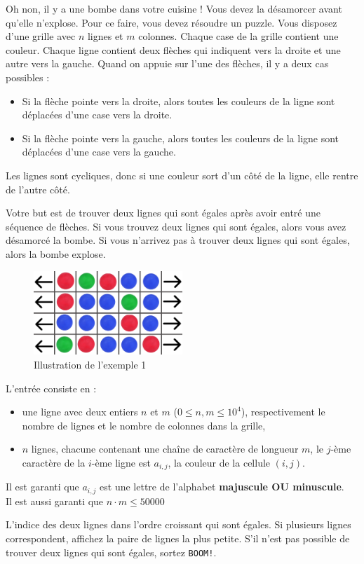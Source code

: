\problemname{\problemyamlname}


Oh non, il y a une bombe dans votre cuisine ! Vous devez la désamorcer avant qu'elle n'explose. Pour ce faire, vous devez résoudre un puzzle.
Vous disposez d'une grille avec $n$ lignes et $m$ colonnes. Chaque case de la grille contient une couleur. Chaque ligne contient deux flèches qui indiquent vers la droite et une autre vers la gauche.
Quand on appuie sur l'une des flèches, il y a deux cas possibles :
\begin{itemize}
    \item Si la flèche pointe vers la droite, alors toutes les couleurs de la ligne sont déplacées d'une case vers la droite.
    \item Si la flèche pointe vers la gauche, alors toutes les couleurs de la ligne sont déplacées d'une case vers la gauche.
\end{itemize}
Les lignes sont cycliques, donc si une couleur sort d'un côté de la ligne, elle rentre de l'autre côté.

Votre but est de trouver deux lignes qui sont égales après avoir entré une séquence de flèches. Si vous trouvez deux lignes qui sont égales, alors vous avez désamorcé la bombe. Si vous n'arrivez pas à trouver deux lignes qui sont égales, alors la bombe explose.

\begin{figure}[H]
    \centering
    \includegraphics[width=0.5\textwidth]{illustration.png}
    \caption{Illustration de l'exemple 1}
\end{figure}

\begin{Input}
    L'entrée consiste en :
    \begin{itemize}
        \item une ligne avec deux entiers $n$ et $m$ ($0\leq n,m \leq 10^4$), respectivement le nombre de lignes et le nombre de colonnes dans la grille,
        \item $n$ lignes, chacune contenant une chaîne de caractère de longueur $m$, le $j$-ème caractère de la $i$-ème ligne est $a_{i,j}$, la couleur de la cellule $(i,j)$.
    \end{itemize}
    Il est garanti que $a_{i,j}$ est une lettre de l'alphabet \textbf{majuscule OU minuscule}.\\
    Il est aussi garanti que $n \cdot m \leq 50000$
\end{Input}

\begin{Output}
    L'indice des deux lignes dans l'ordre croissant qui sont égales. Si plusieurs lignes correspondent, affichez la paire de lignes la plus petite. S'il n'est pas possible de trouver deux lignes qui sont égales, sortez \texttt{BOOM!}.
\end{Output}
